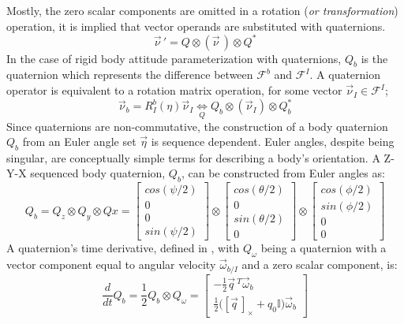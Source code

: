 Mostly, the zero scalar components are omitted in a rotation (\emph{or transformation}) operation, it is implied that vector operands are substituted with quaternions.
\begin{equation}\label{eq:quaternion-rotation}
\vec{\nu}\hspace{2pt}'=Q \otimes (\vec{\nu}\hspace{2pt}) \otimes Q^*
\end{equation} 
In the case of rigid body attitude parameterization with quaternions, $Q_b$ is the quaternion which represents the difference between $\mathcal{F}^b$ and $\mathcal{F}^I$. A quaternion operator is equivalent to a rotation matrix operation, for some vector $\vec{\nu}_I\in\mathcal{F}^I$;
\begin{equation}
\vec{\nu}_b=R_I^b(\eta)\vec{\nu}_I \underset{Q}{\iff} Q_b \otimes (\vec{\nu}_I) \otimes Q_b^*
\end{equation}
Since quaternions are non-commutative, the construction of a body quaternion $Q_b$ from an Euler angle set $\vec{\eta}$ is sequence dependent. Euler angles, despite being singular, are conceptually simple terms for describing a body's orientation. A Z-Y-X sequenced body quaternion, $Q_b$, can be constructed from Euler angles as:
\begin{equation}\label{eq:quaternion-sequence}
Q_b=Q_z\otimes Q_y\otimes Qx=\begin{bmatrix}
cos(\psi/2)\\
0\\
0\\
sin(\psi/2)
\end{bmatrix}
\otimes
\begin{bmatrix}
cos(\theta/2)\\
0\\
sin(\theta/2)\\
0
\end{bmatrix}
\otimes
\begin{bmatrix}
cos(\phi/2)\\
sin(\phi/2)\\
0\\
0
\end{bmatrix}
\end{equation}
A quaternion's time derivative, defined in \cite{quaterniondynamics}, with $Q_\omega$ being a quaternion with a vector component equal to angular velocity $\vec{\omega}_{b/I}$ and a zero scalar component, is:
\begin{equation}\label{eq:quaternion-deriv}
\frac{d}{dt}Q_b=\frac{1}{2}Q_b\otimes Q_{\omega}=\begin{bmatrix}
-\frac{1}{2}\vec{q}\hspace{2pt}^{T} \vec{\omega}_b\\
\frac{1}{2}\big([\vec{q}\hspace{2pt}]_\times+q_0\mathbb{I}\big)\vec{\omega}_b
\end{bmatrix}
\end{equation}
